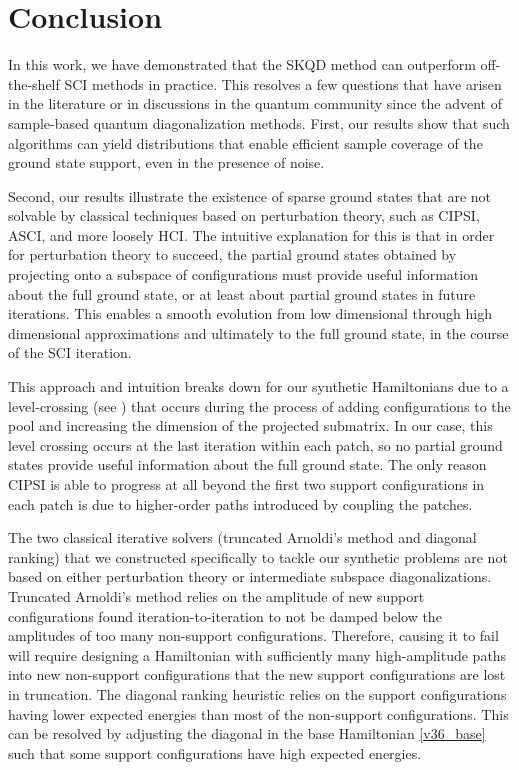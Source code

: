 \documentclass[
  reprint,            %
  amsmath,amssymb,
  aps,
  superscriptaddress, %
  longbibliography
]{revtex4-2}
\theoremstyle{definition}
\begin{document}
\section{Conclusion}
\label{sec:conclusion}

In this work, we have demonstrated that the SKQD method can outperform off-the-shelf SCI methods in practice.
This resolves a few questions that have arisen in the literature or in discussions in the quantum community since the advent of sample-based quantum diagonalization methods.
First, our results show that such algorithms can yield distributions that enable efficient sample coverage of the ground state support, even in the presence of noise.

Second, our results illustrate the existence of sparse ground states that are not solvable by classical techniques based on perturbation theory, such as CIPSI, ASCI, and more loosely HCI.
The intuitive explanation for this is that in order for perturbation theory to succeed, the partial ground states obtained by projecting onto a subspace of configurations must provide useful information about the full ground state, or at least about partial ground states in future iterations.
This enables a smooth evolution from low dimensional through high dimensional approximations and ultimately to the full ground state, in the course of the SCI iteration.

This approach and intuition breaks down for our synthetic Hamiltonians due to a level-crossing (see ) that occurs during the process of adding configurations to the pool and increasing the dimension of the projected submatrix.
In our case, this level crossing occurs at the last iteration within each patch, so no partial ground states provide useful information about the full ground state.
The only reason CIPSI is able to progress at all beyond the first two support configurations in each patch is due to higher-order paths introduced by coupling the patches.

The two classical iterative solvers (truncated Arnoldi's method and diagonal ranking) that we constructed specifically to tackle our synthetic problems are not based on either perturbation theory or intermediate subspace diagonalizations.
Truncated Arnoldi's method relies on the amplitude of new support configurations found iteration-to-iteration to not be damped below the amplitudes of too many non-support configurations.
Therefore, causing it to fail will require designing a Hamiltonian with sufficiently many high-amplitude paths into new non-support configurations that the new support configurations are lost in truncation.
The diagonal ranking heuristic relies on the support configurations having lower expected energies than most of the non-support configurations.
This can be resolved by adjusting the diagonal in the base Hamiltonian \eqref{v36_base} such that some support configurations have high expected energies.
\end{document}
